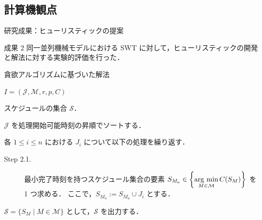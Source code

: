 \documentclass[dvipdfmx]{beamer}
\newcommand{\argmin}{\mathop{\rm arg~min}\limits}
\begin{document}
    \subsection{計算機観点}
    \begin{frame}{研究成果：ヒューリスティックの提案}
      \begin{alertblock}{成果 2}
        同一並列機械モデルにおける SWT に対して，ヒューリスティックの開発と解法に対する実験的評価を行った．
      \end{alertblock}
      \begin{block}{貪欲アルゴリズムに基づいた解法}
        \begin{description}
          \setlength{\leftskip}{-10mm}
          \item[入力 :] $I = (\mathcal{J}, \mathcal{M},r,p,C)$
          \item[出力 :] スケジュールの集合 $\mathcal{S}$．
          \begin{description}
            \setlength{\leftskip}{-25mm}
            \item[Step 1.]
            $\mathcal{J}$ を処理開始可能時刻の昇順でソートする．
            \item[Step 2.]
            各 $1 \le i \le n$ における $J_i$ について以下の処理を繰り返す．
            \begin{description}
              \item[Step 2.1.]
              \setlength{\leftskip}{-40mm}
              最小完了時刻を持つスケジュール集合の要素 $S_{M_a} \in \left\{ \displaystyle \argmin_{M \in \mathcal{M}}C(S_M)\right\}$ を 1 つ求める．
              ここで，$S_{M_a} := S_{M_a} \cup J_i$ とする．
            \end{description}
            \item[Step 3.]
            $\mathcal{S} = \{ S_M \mid M \in \mathcal{M}\}$ として，$\mathcal{S}$ を出力する．
          \end{description}
        \end{description}
      \end{block}
    \end{frame}
\end{document}
